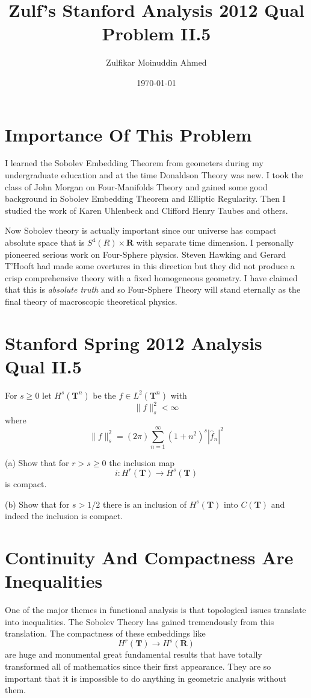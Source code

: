 \documentclass{amsart}
\title{Zulf's Stanford Analysis 2012 Qual Problem II.5}
\author{Zulfikar Moinuddin Ahmed}
\date{\today}
\begin{document}
\maketitle

\section{Importance Of This Problem}

I learned the Sobolev Embedding Theorem from geometers during my undergraduate education and at the time Donaldson Theory was new.  I took the class of John Morgan on Four-Manifolds Theory and gained some good background in Sobolev Embedding Theorem and Elliptic Regularity.  Then I studied the work of Karen Uhlenbeck and Clifford Henry Taubes and others.  

Now Sobolev theory is actually important since our universe has compact absolute space that is $S^4(R)\times\mathbf{R}$ with separate time dimension.  I personally pioneered serious work on Four-Sphere physics.  Steven Hawking and Gerard T'Hooft had made some overtures in this direction but they did not produce a crisp comprehensive theory with a fixed homogeneous geometry.  I have claimed that this is {\em absolute truth} and so Four-Sphere Theory will stand eternally as the final theory of macroscopic theoretical physics.

\section{Stanford Spring 2012 Analysis Qual II.5}

For $s \ge 0$ let $H^s(\mathbf{T}^n)$ be the $f \in L^2(\mathbf{T}^n)$ with 
\[
\| f \|_s^2 < \infty
\]
where
\[
\| f \|_s^2 = (2\pi)\sum_{n=1}^\infty (1+n^2)^s |\hat{f}_n|^2 
\]

(a) Show that for $r > s \ge 0$ the inclusion map
\[
i: H^r(\mathbf{T}) \rightarrow H^s(\mathbf{T})
\]
is compact.  

(b) Show that for $s > 1/2$ there is an inclusion of $H^s(\mathbf{T})$ into $C(\mathbf{T})$ and indeed the inclusion is compact.

\section{Continuity And Compactness Are Inequalities}

One of the major themes in functional analysis is that topological issues translate into inequalities.  The Sobolev Theory has gained tremendously from this translation.  The compactness of these embeddings like 
\[
H^r(\mathbf{T})\rightarrow H^s(\mathbf{R})
\]
are huge and monumental great fundamental results that have totally transformed all of mathematics since their first appearance.  They are so important that it is impossible to do anything in geometric analysis without them.  
\end{document}

